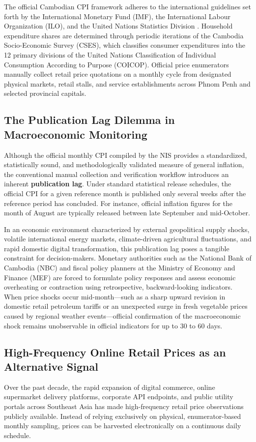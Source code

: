 \hs The official Cambodian CPI framework adheres to the international guidelines set forth by the International Monetary Fund (IMF), the International Labour Organization (ILO), and the United Nations Statistics Division \citep{imf2020cpi}. Household expenditure shares are determined through periodic iterations of the Cambodia Socio-Economic Survey (CSES), which classifies consumer expenditures into the 12 primary divisions of the United Nations Classification of Individual Consumption According to Purpose (COICOP). Official price enumerators manually collect retail price quotations on a monthly cycle from designated physical markets, retail stalls, and service establishments across Phnom Penh and selected provincial capitals.

\subsection{The Publication Lag Dilemma in Macroeconomic Monitoring}
\hs Although the official monthly CPI compiled by the NIS provides a standardized, statistically sound, and methodologically validated measure of general inflation, the conventional manual collection and verification workflow introduces an inherent \textbf{publication lag}. Under standard statistical release schedules, the official CPI for a given reference month is published only several weeks after the reference period has concluded. For instance, official inflation figures for the month of August are typically released between late September and mid-October.

\hs In an economic environment characterized by external geopolitical supply shocks, volatile international energy markets, climate-driven agricultural fluctuations, and rapid domestic digital transformation, this publication lag poses a tangible constraint for decision-makers. Monetary authorities such as the National Bank of Cambodia (NBC) and fiscal policy planners at the Ministry of Economy and Finance (MEF) are forced to formulate policy responses and assess economic overheating or contraction using retrospective, backward-looking indicators. When price shocks occur mid-month---such as a sharp upward revision in domestic retail petroleum tariffs or an unexpected surge in fresh vegetable prices caused by regional weather events---official confirmation of the macroeconomic shock remains unobservable in official indicators for up to 30 to 60 days.

\subsection{High-Frequency Online Retail Prices as an Alternative Signal}
\hs Over the past decade, the rapid expansion of digital commerce, online supermarket delivery platforms, corporate API endpoints, and public utility portals across Southeast Asia has made high-frequency retail price observations publicly available. Instead of relying exclusively on physical, enumerator-based monthly sampling, prices can be harvested electronically on a continuous daily schedule.

